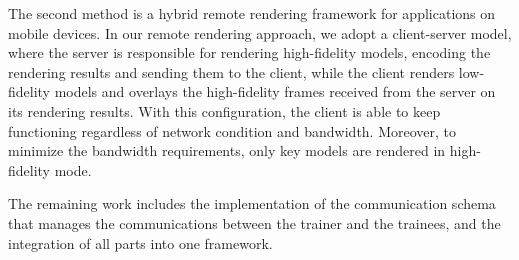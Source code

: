 The second method is a hybrid remote rendering framework for applications on mobile devices. In our remote rendering approach, we adopt a client-server model, where the server is responsible for rendering high-fidelity models, encoding the rendering results and sending them to the client, while the client renders low-fidelity models and overlays the high-fidelity frames received from the server on its rendering results. With this configuration, the client is able to keep functioning regardless of network condition and bandwidth. Moreover, to minimize the bandwidth requirements, only key models are rendered in high-fidelity mode.

The remaining work includes the implementation of the communication schema that manages the communications between the trainer and the trainees, and the integration of all parts into one framework.

\cleardoublepage
